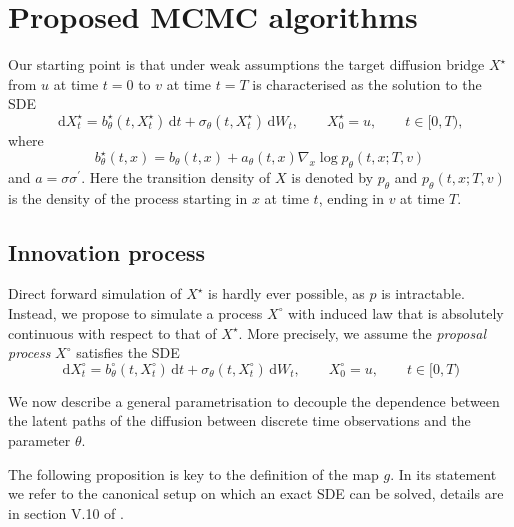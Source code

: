 \documentclass[preprint]{imsart}
\newcommand{\si}{\sigma}
\renewcommand{\th}{\theta}
\theoremstyle{definition}
\newcommand{\dd}{{\,\mathrm d}}
\newcommand{\T}{{\prime}}
\begin{document}
\section{Proposed MCMC algorithms}\label{sec:proposed-algorithm}

Our starting point is that under weak assumptions the target diffusion bridge $X^\star$ from $u$ at time $t=0$ to $v$ at time $t=T$ is characterised as the solution to the SDE
\begin{equation}\label{xstar} 
   \dd X^\star_t=   b_\th^\star(t,X^\star_t) \dd t + \si_\th(t, X^\star_t) \dd W_t,\qquad X^\star_0=u,\qquad t \in [0,T),
\end{equation}
where 
\begin{equation}\label{bstar} 
b^\star_\th(t,x) =b_\th(t,x)+ a_\th(t,x) \nabla_x \log p_\th(t,x;T,v)
\end{equation}
and $a = \sigma\sigma^\T$. Here the transition density of $X$ is denoted by $p_\th$ and $p_\th(t, x; T,v)$  is the density of the process starting in $x$ at time $t$, ending in $v$ at time $T$.
\subsection{Innovation process}
  Direct forward simulation of $X^\star$  is hardly ever possible, as $p$ is intractable. Instead, we propose to simulate a process $X^\circ$ with induced law that is absolutely continuous with respect to that of $X^\star$. More precisely, we assume the {\it proposal process} $X^\circ$ satisfies the SDE
\begin{equation}\label{xcirc} 
\dd X^\circ_t = b_\th^\circ(t, X^\circ_t) \dd t + \sigma_\th(t, X^\circ_t) \dd W_t, \qquad X^\circ_0=u,\qquad t \in [0,T)
\end{equation}

We now describe a general parametrisation to decouple the dependence between the latent paths of the diffusion between discrete time observations and the parameter $\th$. 


The following proposition is key to the definition of the map $g$. In its statement we refer to the canonical setup on which an exact SDE can be solved, details are in section V.10 of \cite{RogersWilliams2}. 
\end{document}
